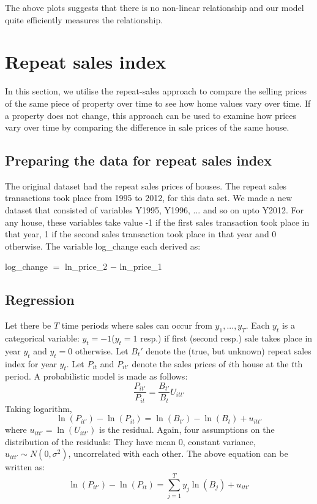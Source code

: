 \documentclass[12pt]{article}
\begin{document}
The above plots suggests that there is no non-linear relationship and our model quite efficiently measures the relationship.

\section{Repeat sales index}
\label{rsi}
In this section, we utilise the repeat-sales approach to compare the selling prices of the same piece of property over time to see how home values vary over time.
If a property does not change, this approach can be used to examine how prices vary over time by comparing the difference in sale prices of the same house.

\subsection{Preparing the data for repeat sales index}
The original dataset had the repeat sales prices of houses. The repeat sales transactions took place from 1995 to 2012, for this data set. We made a new dataset that consisted of variables Y1995, Y1996, ... and so on upto Y2012. For any house, these variables take value -1 if the first sales transaction took place in that year, 1 if the second sales transaction took place in that year and 0 otherwise. The variable log\_change each derived as:
\begin{center}
    log\_change $=$ ln\_price\_2 $-$ ln\_price\_1
\end{center}
\subsection{Regression}
Let there be $T$ time periods where sales can occur from $y_1, ..., y_T$. Each $y_t$ is a categorical variable: $y_t=-1$($y_t=1$ resp.) if first (second resp.) sale takes place in year $y_t$ and $y_t=0$ otherwise. Let $B_{t}'$ denote the (true, but unknown) repeat sales index for year $y_t$. Let $P_{it}$ and $P_{it'}$ denote the sales prices of $i$th house at the $t$th period. A probabilistic model is made as follows:
$$\frac{P_{it'}}{P_{it}}=\frac{B_{t'}}{B_{t}}U_{itt'}$$
Taking logarithm, 
$$\ln(P_{it'})-\ln(P_{it})=\ln(B_{t'})-\ln(B_{t})+u_{itt'} $$
where $u_{itt'}=\ln(U_{itt'})$ is the residual. Again, four assumptions on the distribution of the residuals: They have mean 0, constant variance, $u_{itt'}\sim N(0, \sigma^2)$, uncorrelated with each other.  The above equation can be written as:
$$\ln(P_{it'})-\ln(P_{it})=\sum_{j=1} ^{T}{y_j \ln(B_{j})} +u_{itt'} $$
\end{document}
